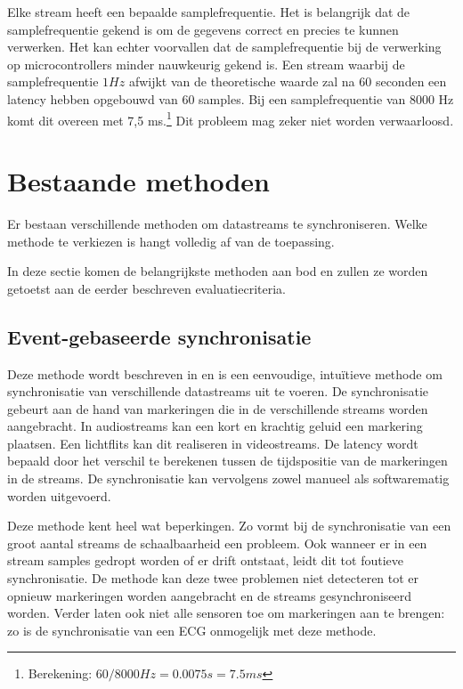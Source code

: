 Elke stream heeft een bepaalde samplefrequentie. Het is belangrijk dat de samplefrequentie gekend is om de gegevens correct en precies te kunnen verwerken. Het kan echter voorvallen dat de samplefrequentie bij de verwerking op microcontrollers minder nauwkeurig gekend is. Een stream waarbij de samplefrequentie $ 1Hz $ afwijkt van de theoretische waarde zal na 60 seconden een latency hebben opgebouwd van 60 samples. Bij een samplefrequentie van 8000 Hz komt dit overeen met 7,5 ms.\footnote{Berekening: $ 60 / 8000 Hz = 0.0075 s = 7.5 ms $} Dit probleem mag zeker niet worden verwaarloosd. 

\section{Bestaande methoden}
\label{bestaande-methoden}

Er bestaan verschillende methoden om datastreams te synchroniseren. Welke methode te verkiezen is hangt volledig af van de toepassing.

In deze sectie komen de belangrijkste methoden aan bod en zullen ze worden getoetst aan de eerder beschreven evaluatiecriteria. 

\subsection{Event-gebaseerde synchronisatie}

Deze methode wordt beschreven in \cite{bannach2009automatic, six2015multimodal} en is een eenvoudige, intuïtieve methode om synchronisatie van verschillende datastreams uit te voeren. De synchronisatie gebeurt aan de hand van markeringen die in de verschillende streams worden aangebracht. In audiostreams kan een kort en krachtig geluid een markering plaatsen. Een lichtflits kan dit realiseren in videostreams. De latency wordt bepaald door het verschil te berekenen tussen de tijdspositie van de markeringen in de streams. De synchronisatie kan vervolgens zowel manueel als softwarematig worden uitgevoerd.

Deze methode kent heel wat beperkingen. Zo vormt bij de synchronisatie van een groot aantal streams de schaalbaarheid een probleem. Ook wanneer er in een stream samples gedropt worden of er drift ontstaat, leidt dit tot foutieve synchronisatie. De methode kan deze twee problemen niet detecteren tot er opnieuw markeringen worden aangebracht en de streams gesynchroniseerd worden. Verder laten ook niet alle sensoren toe om markeringen aan te brengen: zo is de synchronisatie van een ECG onmogelijk met deze methode.

